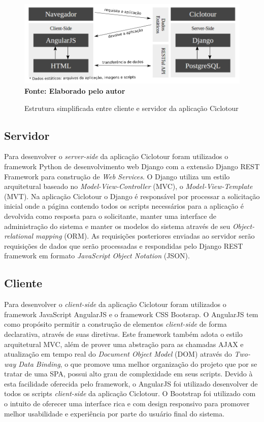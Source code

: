 \begin{figure}[!ht]
	\centering	
	\caption[\hspace{0.1cm} Estrutura simplificada entre cliente e servidor da aplicação Ciclotour.]{Estrutura simplificada entre cliente e servidor da aplicação Ciclotour}
	  \vspace{-0.4cm}
	\includegraphics[width=.8\textwidth]{figuras/estruturaCiclotour.png}
	 \vspace{-0.3cm}
	\\\textbf{\footnotesize Fonte: Elaborado pelo autor}
	\label{fig:estruturaCiclotour}
\end{figure}

\subsection{Servidor}
Para desenvolver o \textit{server-side} da aplicação Ciclotour foram utilizados o framework Python de desenvolvimento web Django com a extensão 
Django REST Framework para construção de \textit{Web Services}. O Django utiliza um estilo arquitetural baseado no \textit{Model-View-Controller}
(MVC), o \textit{Model-View-Template} (MVT). Na aplicação Ciclotour o Django é responsável por processar a solicitação inicial onde a página
contendo todos os scripts necessários para a aplicação é devolvida como resposta para o solicitante, manter uma interface de administração do sistema
e manter os modelos do sistema através de seu \textit{Object-relational mapping} (ORM). As requisições posteriores enviadas ao servidor serão 
requisições de dados que serão processadas e respondidas pelo Django REST framework em formato \textit{JavaScript Object Notation} (JSON).

\subsection{Cliente}
Para desenvolver o \textit{client-side} da aplicação Ciclotour foram utilizados o framework JavaScript AngularJS e o framework CSS Bootsrap. O 
AngularJS tem como propósito permitir a construção de elementos \textit{client-side} de forma declarativa, através de suas diretivas. Este framework 
também adota o estilo arquitetural MVC, além de prover uma abstração para as chamadas AJAX e atualização em tempo real do 
\textit{Document Object Model} (DOM) através do \textit{Two-way Data Binding}, o que promove uma melhor organização do projeto que por se tratar de
uma SPA, possui alto grau de complexidade em seus scripts. Devido à esta facilidade oferecida pelo framework, o AngularJS foi utilizado desenvolver 
de todos os scripts \textit{client-side} da aplicação Ciclotour. O Bootstrap foi utilizado com o intuito de oferecer uma interface rica e com design
responsivo para promover melhor usabilidade e experiência por parte do usuário final do sistema.